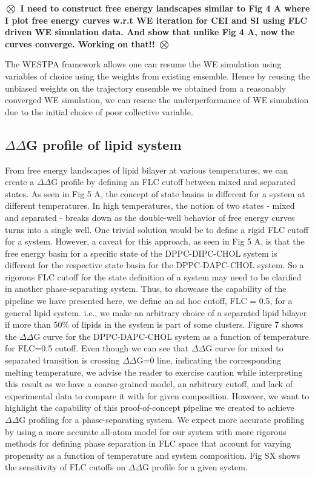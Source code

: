 \documentclass{biophys-new}
\begin{document}
\textbf{$\bigotimes$ I need to construct free energy landscapes similar to Fig 4 A where I plot free energy curves w.r.t WE iteration for CEI and SI using FLC driven WE simulation data. And show that unlike Fig 4 A, now the curves converge. Working on that!! $\bigotimes$}

The WESTPA framework allows one can resume the WE simulation using variables of choice using the weights from existing ensemble\cite{Zhang2010, Zwier2015}.
Hence by reusing the unbiased weights on the trajectory ensemble we obtained from a reasonably converged WE simulation,
we can rescue the underperformance of WE simulation due to the initial choice of poor collective variable.

\subsection*{$\Delta\Delta$G profile of lipid system}

From free energy landscapes of lipid bilayer at various temperatures, we can create a $\Delta\Delta$G profile by defining an FLC cutoff between mixed and separated states.
As seen in Fig 5 A, the concept of state basins is different for a system at different temperatures.
In high temperatures, the notion of two states - mixed and separated - breaks down as the double-well behavior of free energy curves turns into a single well. 
One trivial solution would be to define a rigid FLC cutoff for a system.
However, a caveat for this approach, as seen in Fig 5 A, is that the free energy basin for a specific state of the DPPC-DIPC-CHOL system is different for the respective state basin for the DPPC-DAPC-CHOL system.
So a rigorous FLC cutoff for the state definition of a system may need to be clarified in another phase-separating system.
Thus, to showcase the capability of the pipeline we have presented here, we define an ad hoc cutoff, FLC = 0.5, for a general lipid system.   
i.e., we make an arbitrary choice of a separated lipid bilayer if more than 50\% of lipids in the system is part of some clusters.
Figure 7 shows the $\Delta\Delta$G curve for the DPPC-DAPC-CHOL system as a function of temperature for FLC=0.5 cutoff.
Even though we can see that $\Delta\Delta$G curve for mixed to separated transition is crossing $\Delta\Delta$G=0 line, indicating the corresponding melting temperature,
we advise the reader to exercise caution while interpreting this result as we have a coarse-grained model, an arbitrary cutoff, and lack of experimental data to compare it with for given composition.
However, we want to highlight the capability of this proof-of-concept pipeline we created to achieve $\Delta\Delta$G profiling for a phase-separating system.
We expect more accurate profiling by using a more accurate all-atom model for our system with more rigorous methods for defining phase separation in FLC space that account for 
varying propensity as a function of temperature and system composition.
Fig SX shows the sensitivity of FLC cutoffs on $\Delta\Delta$G profile for a given system.
\end{document}
